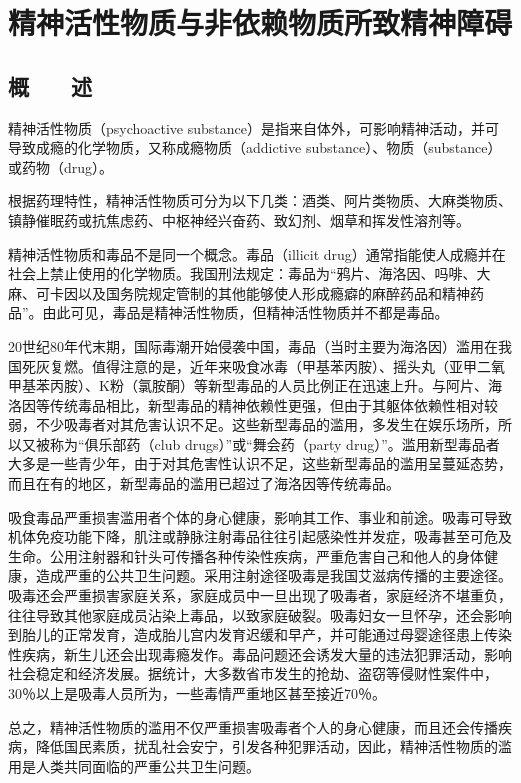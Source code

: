 \chapter{精神活性物质与非依赖物质所致精神障碍}

\section{概　　述}

精神活性物质（psychoactive
substance）是指来自体外，可影响精神活动，并可导致成瘾的化学物质，又称成瘾物质（addictive
substance）、物质（substance）或药物（drug）。

根据药理特性，精神活性物质可分为以下几类：酒类、阿片类物质、大麻类物质、镇静催眠药或抗焦虑药、中枢神经兴奋药、致幻剂、烟草和挥发性溶剂等。

精神活性物质和毒品不是同一个概念。毒品（illicit
drug）通常指能使人成瘾并在社会上禁止使用的化学物质。我国刑法规定：毒品为“鸦片、海洛因、吗啡、大麻、可卡因以及国务院规定管制的其他能够使人形成瘾癖的麻醉药品和精神药品”。由此可见，毒品是精神活性物质，但精神活性物质并不都是毒品。

20世纪80年代末期，国际毒潮开始侵袭中国，毒品（当时主要为海洛因）滥用在我国死灰复燃。值得注意的是，近年来吸食冰毒（甲基苯丙胺）、摇头丸（亚甲二氧甲基苯丙胺）、K粉（氯胺酮）等新型毒品的人员比例正在迅速上升。与阿片、海洛因等传统毒品相比，新型毒品的精神依赖性更强，但由于其躯体依赖性相对较弱，不少吸毒者对其危害认识不足。这些新型毒品的滥用，多发生在娱乐场所，所以又被称为“俱乐部药（club
drugs）”或“舞会药（party
drug）”。滥用新型毒品者大多是一些青少年，由于对其危害性认识不足，这些新型毒品的滥用呈蔓延态势，而且在有的地区，新型毒品的滥用已超过了海洛因等传统毒品。

吸食毒品严重损害滥用者个体的身心健康，影响其工作、事业和前途。吸毒可导致机体免疫功能下降，肌注或静脉注射毒品往往引起感染性并发症，吸毒甚至可危及生命。公用注射器和针头可传播各种传染性疾病，严重危害自己和他人的身体健康，造成严重的公共卫生问题。采用注射途径吸毒是我国艾滋病传播的主要途径。吸毒还会严重损害家庭关系，家庭成员中一旦出现了吸毒者，家庭经济不堪重负，往往导致其他家庭成员沾染上毒品，以致家庭破裂。吸毒妇女一旦怀孕，还会影响到胎儿的正常发育，造成胎儿宫内发育迟缓和早产，并可能通过母婴途径患上传染性疾病，新生儿还会出现毒瘾发作。毒品问题还会诱发大量的违法犯罪活动，影响社会稳定和经济发展。据统计，大多数省市发生的抢劫、盗窃等侵财性案件中，30％以上是吸毒人员所为，一些毒情严重地区甚至接近70％。

总之，精神活性物质的滥用不仅严重损害吸毒者个人的身心健康，而且还会传播疾病，降低国民素质，扰乱社会安宁，引发各种犯罪活动，因此，精神活性物质的滥用是人类共同面临的严重公共卫生问题。

